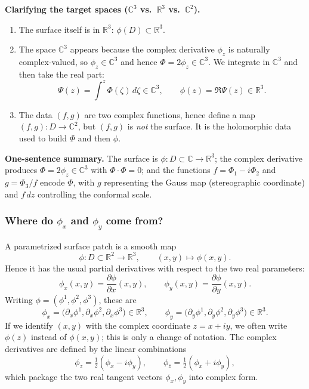 \documentclass[12pt,a4paper]{article}
\theoremstyle{plain}
\theoremstyle{definition}      %
\begin{document}
\smallskip
\textbf{Clarifying the target spaces ($\mathbb C^3$ vs.\ $\mathbb R^3$ vs.\ $\mathbb C^2$).}
\begin{enumerate}
	\item The surface itself is in $\mathbb R^3$: $\phi(D)\subset\mathbb R^3$.
	\item The space $\mathbb C^3$ appears because the complex derivative $\phi_z$ is naturally complex-valued, so
	$\phi_z\in\mathbb C^3$ and hence $\Phi=2\phi_z\in\mathbb C^3$.
	We integrate in $\mathbb C^3$ and then take the real part:
	\[
	\Psi(z)=\int^z \Phi(\zeta)\,d\zeta\in\mathbb C^3,
	\qquad
	\phi(z)=\Re\Psi(z)\in\mathbb R^3.
	\]
	\item The data $(f,g)$ are two complex functions, hence define a map $(f,g):D\to\mathbb C^2$,
	but $(f,g)$ is \emph{not} the surface. It is the holomorphic data used to build $\Phi$ and then $\phi$.
\end{enumerate}

\medskip
\textbf{One-sentence summary.}
The surface is $\phi:D\subset\mathbb C\to\mathbb R^3$; the complex derivative produces $\Phi=2\phi_z\in\mathbb C^3$ with
$\Phi\cdot\Phi=0$; and the functions $f=\Phi_1-i\Phi_2$ and $g=\Phi_3/f$ encode $\Phi$, with $g$ representing the Gauss map
(stereographic coordinate) and $f\,dz$ controlling the conformal scale.

\medskip

\subsubsection*{Where do $\phi_x$ and $\phi_y$ come from?}
A parametrized surface patch is a smooth map
\[
\phi : D \subset \mathbb R^2 \to \mathbb R^3,\qquad (x,y)\mapsto \phi(x,y).
\]
Hence it has the usual partial derivatives with respect to the two real parameters:
\[
\phi_x(x,y)=\frac{\partial \phi}{\partial x}(x,y),\qquad
\phi_y(x,y)=\frac{\partial \phi}{\partial y}(x,y).
\]
Writing $\phi=(\phi^1,\phi^2,\phi^3)$, these are
\[
\phi_x=\big(\partial_x\phi^1,\partial_x\phi^2,\partial_x\phi^3\big)\in\mathbb R^3,
\qquad
\phi_y=\big(\partial_y\phi^1,\partial_y\phi^2,\partial_y\phi^3\big)\in\mathbb R^3.
\]
If we identify $(x,y)$ with the complex coordinate $z=x+iy$, we often write $\phi(z)$ instead of $\phi(x,y)$; this is only
a change of notation.
The complex derivatives are defined by the linear combinations
\[
\phi_z=\tfrac12(\phi_x-i\phi_y),\qquad
\phi_{\bar z}=\tfrac12(\phi_x+i\phi_y),
\]
which package the two real tangent vectors $\phi_x,\phi_y$ into complex form.
\end{document}
